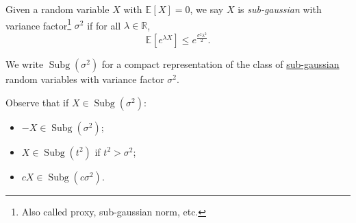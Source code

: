 \begin{definition}\label{def:sub-gaussian}
	Given a random variable \(X\) with \(\mathbb{E}_{}\left[X \right] = 0\), we say \(X\) is \emph{sub-gaussian} with variance factor\footnote{Also called proxy, sub-gaussian norm, etc.} \(\sigma ^2\) if for all \(\lambda \in \mathbb{R} \),
	\[
		\mathbb{E}_{}\left[e^{\lambda X} \right] \leq e^{\frac{\sigma ^2 \lambda ^2}{2}}.
	\]
\end{definition}

\begin{notation}
	We write \(\mathop{\mathrm{Subg}}(\sigma ^{2} ) \) for a compact representation of the class of \hyperref[def:sub-gaussian]{sub-gaussian} random variables with variance factor \(\sigma ^{2} \).
\end{notation}

\begin{remark}
	Observe that if \(X\in \mathop{\mathrm{Subg}}(\sigma ^{2} ) \):
	\begin{itemize}
		\item \(-X\in \mathop{\mathrm{Subg}}(\sigma ^{2} ) \);
		\item \(X \in \mathop{\mathrm{Subg}}(t^2) \) if \(t^2 > \sigma ^{2} \);
		\item \(cX\in \mathop{\mathrm{Subg}}(c \sigma ^{2} ) \).
	\end{itemize}
\end{remark}

